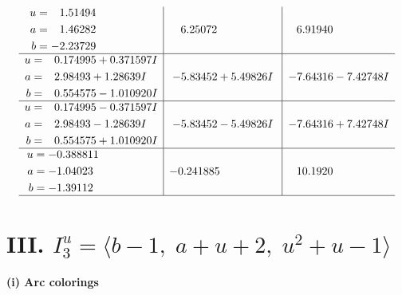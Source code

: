 \documentclass[1p]{elsarticle_modified}
\theoremstyle{definition}
\begin{document}
$$\begin{array}{c|c|c}
\begin{aligned}
u &= \phantom{-}1.51494\phantom{ +0.000000I} \\
a &= \phantom{-}1.46282\phantom{ +0.000000I} \\
b &= -2.23729\phantom{ +0.000000I}\end{aligned}
 & \phantom{-}6.25072\phantom{ +0.000000I} & \phantom{-}6.91940\phantom{ +0.000000I} \\ \hline\begin{aligned}
u &= \phantom{-}0.174995 + 0.371597 I \\
a &= \phantom{-}2.98493 + 1.28639 I \\
b &= \phantom{-}0.554575 - 1.010920 I\end{aligned}
 & -5.83452 + 5.49826 I & -7.64316 - 7.42748 I \\ \hline\begin{aligned}
u &= \phantom{-}0.174995 - 0.371597 I \\
a &= \phantom{-}2.98493 - 1.28639 I \\
b &= \phantom{-}0.554575 + 1.010920 I\end{aligned}
 & -5.83452 - 5.49826 I & -7.64316 + 7.42748 I \\ \hline\begin{aligned}
u &= -0.388811\phantom{ +0.000000I} \\
a &= -1.04023\phantom{ +0.000000I} \\
b &= -1.39112\phantom{ +0.000000I}\end{aligned}
 & -0.241885\phantom{ +0.000000I} & \phantom{-}10.1920\phantom{ +0.000000I}\\
 \hline 
 \end{array}$$\newpage\newpage\renewcommand{\arraystretch}{1}
\centering \section*{III. $I^u_{3}= \langle b-1,\;a+u+2,\;u^2+u-1 \rangle$}
\flushleft \textbf{(i) Arc colorings}\\
\end{document}
